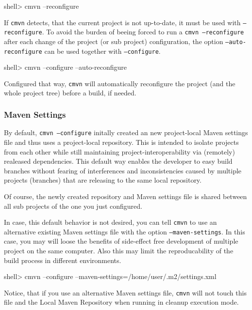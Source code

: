 \documentclass[a4paper,12pt,english,oneside,halfparskip]{scrartcl}
\newcommand{\cmvn}{\texttt{cmvn}}
\newcommand{\code}[1]{\texttt{#1}}
\begin{document}
\begin{Cmdline}
shell> cmvn --reconfigure
\end{Cmdline}

If \cmvn{} detects, that the current project is not up-to-date, it must be used with \code{--reconfigure}. To avoid the burden of beeing forced to run a \code{cmvn --reconfigure} after each change of the project (or sub project) configuration, the option \code{--auto-reconfigure} can be used together with \code{--configure}. 

\begin{Cmdline}
shell> cmvn --configure --auto-reconfigure
\end{Cmdline}

Configured that way, \cmvn{} will automatically reconfigure the project (and the whole project tree) before a build, if needed.

\subsubsection{Maven Settings}

By default, \code{cmvn --configure} initally created an new project-local Maven settings file and thus uses a project-local repository. This is intended to isolate projects from each other while still maintaining project-interoperability via (remotely) realeased dependencies. This default way enables the developer to easy build branches without fearing of interferences and inconsistencies caused by multiple projects (branches) that are releasing to the same local repository. 

Of course, the newly created repository and Maven settings file is shared between all sub projects of the one you just configured.

In case, this default behavior is not desired, you can tell \cmvn{} to use an alternative existing Maven settings file with the option \code{--maven-settings}. In this case, you may will loose the benefits of side-effect free development of multiple project on the same computer. Also this may limit the reproducability of the build process in different environments. 

\begin{Cmdline}
shell> cmvn --configure --maven-settings=/home/user/.m2/settings.xml
\end{Cmdline}


Notice, that if you use an alternative Maven settings file, \cmvn{} will not touch this file and the Local Maven Repository when running in cleanup execution mode.
\end{document}
